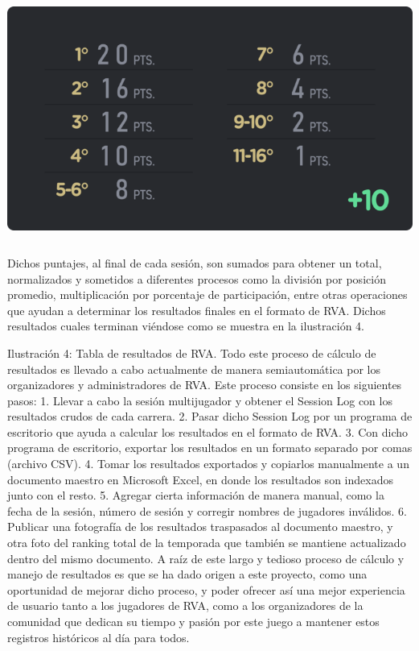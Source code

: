 \includegraphics[width=15cm, height=8cm]{img/points-big.png}

Dichos puntajes, al final de cada sesión, son sumados para obtener un total, normalizados y sometidos a diferentes procesos como la división por posición promedio, multiplicación por porcentaje de participación, entre otras operaciones que ayudan a determinar los resultados finales en el formato de RVA. Dichos resultados cuales terminan viéndose como se muestra en la ilustración 4.

Ilustración 4: Tabla de resultados de RVA.
Todo este proceso de cálculo de resultados es llevado a cabo actualmente de manera semiautomática por los organizadores y administradores de RVA. Este proceso consiste en los siguientes pasos:
1.	Llevar a cabo la sesión multijugador y obtener el Session Log con los resultados crudos de cada carrera.
2.	Pasar dicho Session Log por un programa de escritorio que ayuda a calcular los resultados en el formato de RVA.
3.	Con dicho programa de escritorio, exportar los resultados en un formato separado por comas (archivo CSV).
4.	Tomar los resultados exportados y copiarlos manualmente a un documento maestro en Microsoft Excel, en donde los resultados son indexados junto con el resto.
5.	Agregar cierta información de manera manual, como la fecha de la sesión, número de sesión y corregir nombres de jugadores inválidos.
6.	Publicar una fotografía de los resultados traspasados al documento maestro, y otra foto del ranking total de la temporada que también se mantiene actualizado dentro del mismo documento.
A raíz de este largo y tedioso proceso de cálculo y manejo de resultados es que se ha dado origen a este proyecto, como una oportunidad de mejorar dicho proceso, y poder ofrecer así una mejor experiencia de usuario tanto a los jugadores de RVA, como a los organizadores de la comunidad que dedican su tiempo y pasión por este juego a mantener estos registros históricos al día para todos.


